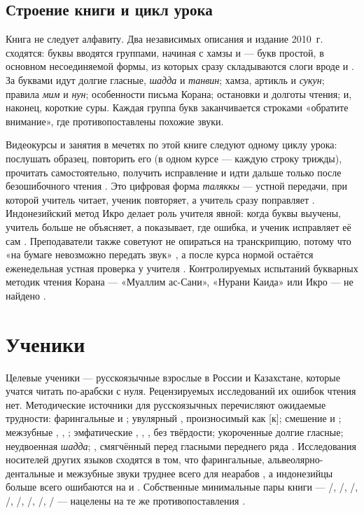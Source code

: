 \subsection{Строение книги и цикл урока}

Книга не следует алфавиту. Два независимых описания и издание 2010~г. сходятся: буквы вводятся
группами, начиная с хамзы и  --- букв простой, в основном несоединяемой формы, из которых сразу
складываются слоги вроде  и  \cite{SRC-021,SRC-040}. За буквами идут долгие гласные,
\emph{шадда} и \emph{танвин}; хамза, артикль и \emph{сукун}; правила \emph{мим} и \emph{нун}; особенности
письма Корана; остановки и долготы чтения; и, наконец, короткие суры. Каждая группа букв заканчивается
строками «обратите внимание», где противопоставлены похожие звуки.

Видеокурсы и занятия в мечетях по этой книге следуют одному циклу урока: послушать образец, повторить
его (в одном курсе --- каждую строку трижды), прочитать самостоятельно, получить исправление и идти
дальше только после безошибочного чтения \cite{SRC-021,SRC-022}. Это цифровая форма \emph{таляккы} ---
устной передачи, при которой учитель читает, ученик повторяет, а учитель сразу поправляет
\cite{SRC-058}. Индонезийский метод Икро делает роль учителя явной: когда буквы выучены, учитель больше
не объясняет, а показывает, где ошибка, и ученик исправляет её сам \cite{SRC-057}. Преподаватели также
советуют не опираться на транскрипцию, потому что «на бумаге невозможно передать звук»
\cite{SRC-021,SRC-022}, а после курса нормой остаётся еженедельная устная проверка у учителя
\cite{SRC-039}. Контролируемых испытаний букварных методик чтения Корана --- «Муаллим ас-Сани», «Нурани
Каида» или Икро --- не найдено \cite{SRC-038}.

\section{Ученики}\label{sec:lr-learners}

Целевые ученики --- русскоязычные взрослые в России и Казахстане, которые учатся читать по-арабски с нуля.
Рецензируемых исследований их ошибок чтения нет. Методические источники для русскоязычных перечисляют
ожидаемые трудности: фарингальные  и ; увулярный , произносимый как [к]; смешение 
и ; межзубные , , ; эмфатические , , ,  без твёрдости;
укороченные долгие гласные; неудвоенная \emph{шадда}; , смягчённый перед гласными переднего ряда
\cite{SRC-023}. Исследования носителей других языков сходятся в том, что фарингальные, альвеолярно-дентальные
и межзубные звуки труднее всего для неарабов \cite{SRC-034}, а индонезийцы больше всего ошибаются на
 и  \cite{SRC-035}. Собственные минимальные пары книги --- /, /,
/, /, /, /, /, / --- нацелены
на те же противопоставления \cite{SRC-040}.

